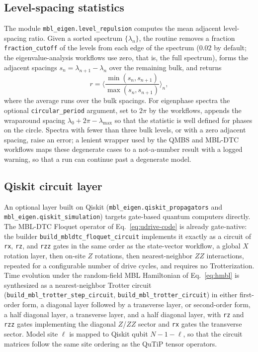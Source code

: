 \documentclass[longbibliography]{revtex4-2}
\begin{document}
\subsection{Level-spacing statistics}\label{subsec:level-spacing}

The module \texttt{mbl\_eigen.level\_repulsion} computes the mean
adjacent level-spacing ratio. Given a sorted spectrum
$\{\lambda_n\}$, the routine removes a fraction
\texttt{fraction\_cutoff} of the levels from each edge of the spectrum
($0.02$ by default; the eigenvalue-analysis workflows use zero, that
is, the full spectrum), forms the adjacent spacings
$s_n = \lambda_{n+1} - \lambda_n$ over the remaining bulk, and returns
\begin{equation}\label{eq:spacing-ratio}
    r = \Big\langle
    \frac{\min(s_n, s_{n+1})}{\max(s_n, s_{n+1})}
    \Big\rangle_{n},
\end{equation}
where the average runs over the bulk spacings. For eigenphase spectra
the optional \texttt{circular\_period} argument, set to $2\pi$ by the
workflows, appends the wraparound spacing
$\lambda_{0} + 2\pi - \lambda_{\max}$ so that the statistic is well
defined for phases on the circle. Spectra with fewer than three bulk
levels, or with a zero adjacent spacing, raise an error; a lenient
wrapper used by the QMBS and MBL-DTC workflows maps these degenerate
cases to a not-a-number result with a logged warning, so that a run can
continue past a degenerate model.

\subsection{Qiskit circuit layer}\label{subsec:qiskit}

An optional layer built on Qiskit (\texttt{mbl\_eigen.qiskit\_propagators}
and \texttt{mbl\_eigen.qiskit\_simulation}) targets gate-based quantum
computers directly. The MBL-DTC Floquet operator of
Eq.~\eqref{eq:udrive-code} is already gate-native: the builder
\texttt{build\_mbldtc\_floquet\_circuit} implements it exactly as a
circuit of \texttt{rx}, \texttt{rz}, and \texttt{rzz} gates in the same
order as the state-vector workflow, a global $X$ rotation layer, then
on-site $Z$ rotations, then nearest-neighbor $ZZ$ interactions, repeated
for a configurable number of drive cycles, and requires no
Trotterization. Time evolution under the random-field MBL Hamiltonian of
Eq.~\eqref{eq:hmbl} is synthesized as a nearest-neighbor Trotter circuit
(\texttt{build\_mbl\_trotter\_step\_circuit},
\texttt{build\_mbl\_trotter\_circuit}) in either first-order form, a
diagonal layer followed by a transverse layer, or second-order form, a
half diagonal layer, a transverse layer, and a half diagonal layer, with
\texttt{rz} and \texttt{rzz} gates implementing the diagonal $Z$/$ZZ$
sector and \texttt{rx} gates the transverse sector. Model site $\ell$ is
mapped to Qiskit qubit $N - 1 - \ell$, so that the circuit matrices
follow the same site ordering as the QuTiP tensor operators.
\end{document}

